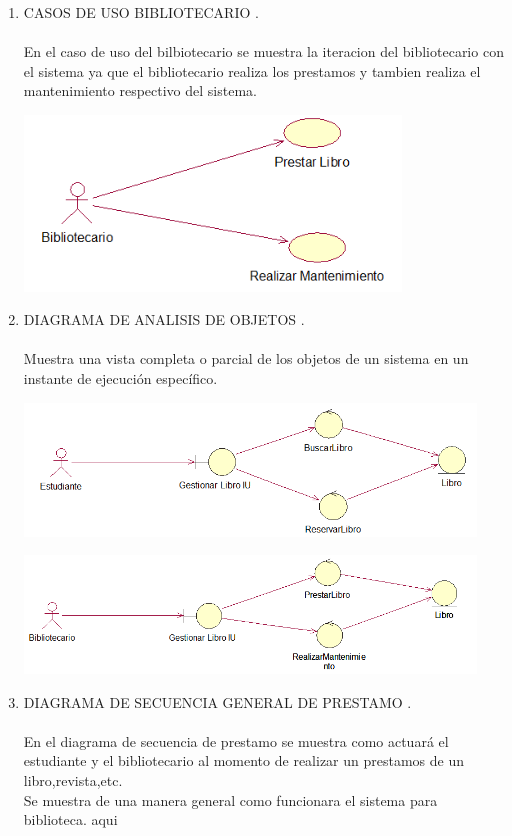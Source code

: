 \begin{enumerate}[1.]
	\item CASOS DE USO BIBLIOTECARIO .\\\\
		En el caso de uso del bilbiotecario se muestra la iteracion del bibliotecario con el sistema ya que el bibliotecario 	realiza los prestamos y tambien realiza el mantenimiento respectivo del sistema.
	\begin{center}
	\includegraphics[width=10cm]{./Imagenes/img2} 
	\end{center}
\newpage
   	 \item DIAGRAMA DE ANALISIS DE OBJETOS .\\\\
    Muestra una vista completa o parcial de los objetos de un sistema en un instante de ejecución específico.
	\begin{center}
	\includegraphics[width=12cm]{./Imagenes/img10} 
	\end{center}
	\begin{center}
	\includegraphics[width=12cm]{./Imagenes/img11} 
	\end{center}
\newpage
   	 \item DIAGRAMA DE SECUENCIA GENERAL DE PRESTAMO .\\\\
    En el diagrama de secuencia de prestamo se muestra como actuará el estudiante y el bibliotecario al momento de realizar un prestamos de un libro,revista,etc.\\
    Se muestra de una manera general como funcionara el sistema para biblioteca.
	aqui
	

\end{enumerate}
